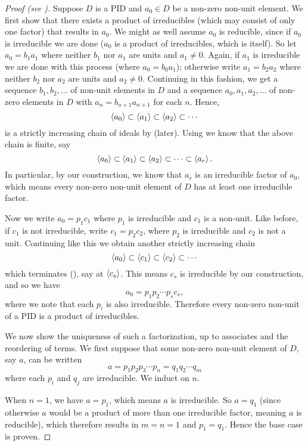 \begin{proof}[Proof (see {\cite[pp.~313-314]{gallian_2016}})]
    Suppose $D$ is a PID and $a_0 \in D$ be a non-zero non-unit element. We first show that there exists a product of irreducibles (which may consist of only one factor) that results in $a_0$. We might as well assume $a_0$ is reducible, since if $a_0$ is irreducible we are done ($a_0$ is a product of irreducibles, which is itself). So let $a_0 = b_1a_1$ where neither $b_1$ nor $a_1$ are units and $a_1 \neq 0$. Again, if $a_1$ is irreducible we are done with this process (where $a_0 = b_0a_1$); otherwise write $a_1 = b_2a_2$ where neither $b_2$ nor $a_2$ are units and $a_2 \neq 0$. Continuing in this fashion, we get a sequence $b_1,b_2,\dots$ of non-unit elements in $D$ and a sequence $a_0,a_1,a_2,\dots$ of non-zero elements in $D$ with $a_n = b_{n+1}a_{n+1}$ for each $n$. Hence,
    \[
        \left\langle a_0\right\rangle \subset \left\langle a_1\right\rangle \subset \left\langle a_2\right\rangle \subset \cdots
    \]
    is a strictly increasing chain of ideals by  (later). Using  we know that the above chain is finite, say
    \[
        \left\langle a_0\right\rangle \subset \left\langle a_1\right\rangle \subset \left\langle a_2\right\rangle \subset \cdots \subset \left\langle a_r\right\rangle.
    \]
    In particular, by our construction, we know that $a_r$ is an irreducible factor of $a_0$, which means every non-zero non-unit element of $D$ has at least one irreducible factor.

    Now we write $a_0 = p_1c_1$ where $p_1$ is irreducible and $c_1$ is a non-unit. Like before, if $c_1$ is not irreducible, write $c_1 = p_2c_2$, where $p_2$ is irreducible and $c_2$ is not a unit. Continuing like this we obtain another strictly increasing chain
    \[
        \left\langle a_0\right\rangle \subset \left\langle c_1\right\rangle \subset \left\langle c_2\right\rangle \subset \cdots
    \]
    which terminates (), say at $\left\langle c_s\right\rangle$. This means $c_s$ is irreducible by our construction, and so we have
    \[
        a_0 = p_1p_2\cdots p_sc_s,
    \]
    where we note that each $p_i$ is also irreducible. Therefore every non-zero non-unit of a PID is a product of irreducibles.

    We now show the uniqueness of such a factorization, up to associates and the reordering of terms. We first suppose that some non-zero non-unit element of $D$, say $a$, can be written
    \[
        a = p_1p_2p_3\cdots p_n = q_1q_2 \cdots q_m
    \]
    where each $p_i$ and $q_j$ are irreducible. We induct on $n$.

    When $n = 1$, we have $a = p_1$, which means $a$ is irreducible. So $a = q_1$ (since otherwise $a$ would be a product of more than one irreducible factor, meaning $a$ is reducible), which therefore results in $m = n = 1$ and $p_1 = q_1$. Hence the base case is proven.


\end{proof}
